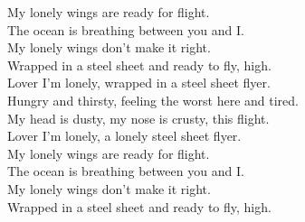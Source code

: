 My lonely wings are ready for flight. \\
The ocean is breathing between you and I. \\
My lonely wings don't make it right. \\
Wrapped in a steel sheet and ready to fly, high. \\

Lover I'm lonely, wrapped in a steel sheet flyer. \\
Hungry and thirsty, feeling the worst here and tired. \\
My head is dusty, my nose is crusty, this flight. \\
Lover I'm lonely, a lonely steel sheet flyer. \\

My lonely wings are ready for flight. \\
The ocean is breathing between you and I. \\
My lonely wings don't make it right. \\
Wrapped in a steel sheet and ready to fly, high. \\

